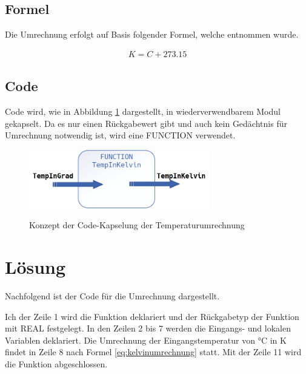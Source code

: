 \documentclass[10pt,a4paper]{article}
\begin{document}
\subsection{Formel}

Die Umrechnung erfolgt auf Basis folgender Formel,  welche \cite{Kuchling.2014} entnommen wurde.

	\begin{align}
		K = C+ 273.15 \label{eq:kelvinumrechnung}
	\end{align}
	
\subsection{Code}
Code wird,  wie in Abbildung \ref{fig:fc_temp} dargestellt,  in wiederverwendbarem Modul gekapselt.  Da es nur einen Rückgabewert gibt und auch kein Gedächtnis für Umrechnung notwendig ist,  wird eine FUNCTION verwendet. 

\begin{figure}[h]
				\centering
				\colorbox{white}{\includegraphics[width=0.7\textwidth]{bilder/FC_bild.png}}
				\caption{Konzept der Code-Kapselung der Temperaturumrechnung}
				\label{fig:fc_temp}
			\end{figure}

\pagebreak
\section{Lösung}
Nachfolgend ist der Code für die Umrechnung dargestellt.  
\bigskip

\scriptsize

    
\normalsize
\bigskip

Ich der Zeile 1 wird die Funktion deklariert und der Rückgabetyp der Funktion mit REAL festgelegt.  In den Zeilen 2 bis 7 werden die Eingangs- und lokalen Variablen deklariert.  Die Umrechnung der Eingangstemperatur von °C in K findet in Zeile 8 nach Formel \eqref{eq:kelvinumrechnung} statt.  Mit der Zeile 11 wird die Funktion abgeschlossen. 

\pagebreak
\end{document}
